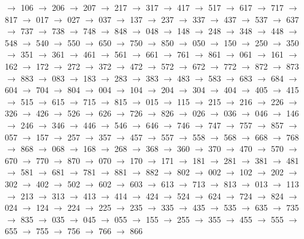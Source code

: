 $\rightarrow$ 106 $\rightarrow$ 206 $\rightarrow$ 207 $\rightarrow$ 217 $\rightarrow$ 317 $\rightarrow$ 417 $\rightarrow$ 517 $\rightarrow$ 617 $\rightarrow$ 717 $\rightarrow$ 817 $\rightarrow$ 017 $\rightarrow$ 027 $\rightarrow$ 037 $\rightarrow$ 137 $\rightarrow$ 237 $\rightarrow$ 337 $\rightarrow$ 437 $\rightarrow$ 537 $\rightarrow$ 637 $\rightarrow$ 737 $\rightarrow$ 738 $\rightarrow$ 748 $\rightarrow$ 848 $\rightarrow$ 048 $\rightarrow$ 148 $\rightarrow$ 248 $\rightarrow$ 348 $\rightarrow$ 448 $\rightarrow$ 548 $\rightarrow$ 540 $\rightarrow$ 550 $\rightarrow$ 650 $\rightarrow$ 750 $\rightarrow$ 850 $\rightarrow$ 050 $\rightarrow$ 150 $\rightarrow$ 250 $\rightarrow$ 350 $\rightarrow$ 351 $\rightarrow$ 361 $\rightarrow$ 461 $\rightarrow$ 561 $\rightarrow$ 661 $\rightarrow$ 761 $\rightarrow$ 861 $\rightarrow$ 061 $\rightarrow$ 161 $\rightarrow$ 162 $\rightarrow$ 172 $\rightarrow$ 272 $\rightarrow$ 372 $\rightarrow$ 472 $\rightarrow$ 572 $\rightarrow$ 672 $\rightarrow$ 772 $\rightarrow$ 872 $\rightarrow$ 873 $\rightarrow$ 883 $\rightarrow$ 083 $\rightarrow$ 183 $\rightarrow$ 283 $\rightarrow$ 383 $\rightarrow$ 483 $\rightarrow$ 583 $\rightarrow$ 683 $\rightarrow$ 684 $\rightarrow$ 604 $\rightarrow$ 704 $\rightarrow$ 804 $\rightarrow$ 004 $\rightarrow$ 104 $\rightarrow$ 204 $\rightarrow$ 304 $\rightarrow$ 404 $\rightarrow$ 405 $\rightarrow$ 415 $\rightarrow$ 515 $\rightarrow$ 615 $\rightarrow$ 715 $\rightarrow$ 815 $\rightarrow$ 015 $\rightarrow$ 115 $\rightarrow$ 215 $\rightarrow$ 216 $\rightarrow$ 226 $\rightarrow$ 326 $\rightarrow$ 426 $\rightarrow$ 526 $\rightarrow$ 626 $\rightarrow$ 726 $\rightarrow$ 826 $\rightarrow$ 026 $\rightarrow$ 036 $\rightarrow$ 046 $\rightarrow$ 146 $\rightarrow$ 246 $\rightarrow$ 346 $\rightarrow$ 446 $\rightarrow$ 546 $\rightarrow$ 646 $\rightarrow$ 746 $\rightarrow$ 747 $\rightarrow$ 757 $\rightarrow$ 857 $\rightarrow$ 057 $\rightarrow$ 157 $\rightarrow$ 257 $\rightarrow$ 357 $\rightarrow$ 457 $\rightarrow$ 557 $\rightarrow$ 558 $\rightarrow$ 568 $\rightarrow$ 668 $\rightarrow$ 768 $\rightarrow$ 868 $\rightarrow$ 068 $\rightarrow$ 168 $\rightarrow$ 268 $\rightarrow$ 368 $\rightarrow$ 360 $\rightarrow$ 370 $\rightarrow$ 470 $\rightarrow$ 570 $\rightarrow$ 670 $\rightarrow$ 770 $\rightarrow$ 870 $\rightarrow$ 070 $\rightarrow$ 170 $\rightarrow$ 171 $\rightarrow$ 181 $\rightarrow$ 281 $\rightarrow$ 381 $\rightarrow$ 481 $\rightarrow$ 581 $\rightarrow$ 681 $\rightarrow$ 781 $\rightarrow$ 881 $\rightarrow$ 882 $\rightarrow$ 802 $\rightarrow$ 002 $\rightarrow$ 102 $\rightarrow$ 202 $\rightarrow$ 302 $\rightarrow$ 402 $\rightarrow$ 502 $\rightarrow$ 602 $\rightarrow$ 603 $\rightarrow$ 613 $\rightarrow$ 713 $\rightarrow$ 813 $\rightarrow$ 013 $\rightarrow$ 113 $\rightarrow$ 213 $\rightarrow$ 313 $\rightarrow$ 413 $\rightarrow$ 414 $\rightarrow$ 424 $\rightarrow$ 524 $\rightarrow$ 624 $\rightarrow$ 724 $\rightarrow$ 824 $\rightarrow$ 024 $\rightarrow$ 124 $\rightarrow$ 224 $\rightarrow$ 225 $\rightarrow$ 235 $\rightarrow$ 335 $\rightarrow$ 435 $\rightarrow$ 535 $\rightarrow$ 635 $\rightarrow$ 735 $\rightarrow$ 835 $\rightarrow$ 035 $\rightarrow$ 045 $\rightarrow$ 055 $\rightarrow$ 155 $\rightarrow$ 255 $\rightarrow$ 355 $\rightarrow$ 455 $\rightarrow$ 555 $\rightarrow$ 655 $\rightarrow$ 755 $\rightarrow$ 756 $\rightarrow$ 766 $\rightarrow$ 866 